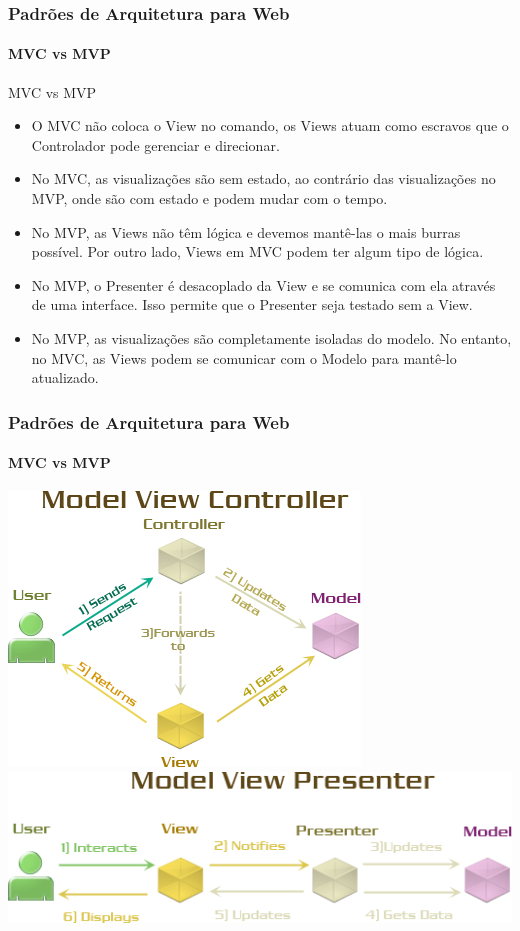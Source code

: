 \documentclass[
	9pt, %
	t, %
]{beamer}
\begin{document}
\begin{frame}
	\frametitle{Padrões de Arquitetura para Web}
	\framesubtitle{MVC vs MVP}

	\begin{block}{MVC vs MVP}
		\begin{itemize}
			\item O \alert{MVC} não coloca o View no comando, os Views atuam como escravos que o Controlador pode gerenciar e direcionar.
			\item No \alert{MVC}, as visualizações são sem estado, ao contrário das visualizações no MVP, onde são com estado e podem mudar com o tempo.
			\item No \alert{MVP}, as Views não têm lógica e devemos mantê-las o mais burras possível. Por outro lado, Views em MVC podem ter algum tipo de lógica.
			\item No \alert{MVP}, o Presenter é desacoplado da View e se comunica com ela através de uma interface. Isso permite que o Presenter seja testado sem a View.
			\item No \alert{MVP}, as visualizações são completamente isoladas do modelo. No entanto, no MVC, as Views podem se comunicar com o Modelo para mantê-lo atualizado.
		\end{itemize}
	\end{block}

\end{frame}

\begin{frame}
	\frametitle{Padrões de Arquitetura para Web}
	\framesubtitle{MVC vs MVP}

	\centering
	\includegraphics[width=0.5\linewidth]{Images/mvc2.png}
	\includegraphics[width=0.8\linewidth]{Images/mvp2.png}

\end{frame}
\end{document}
